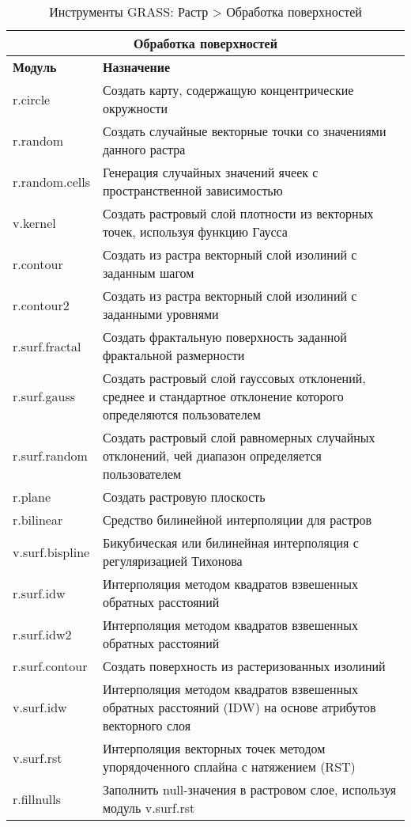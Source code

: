 {\renewcommand{\arraystretch}{0.7}
\begin{table}[H]
\centering
 \begin{tabular}{|p{4cm}|p{10cm}|}
  \hline \multicolumn{2}{|c|}{\textbf{Обработка поверхностей}} \\
  \hline \textbf{Модуль} & \textbf{Назначение} \\
  \hline r.circle & Создать карту, содержащую концентрические окружности \\
  \hline r.random & Создать случайные векторные точки со значениями данного
  растра \\
  \hline r.random.cells & Генерация случайных значений ячеек с
  пространственной зависимостью \\
  \hline v.kernel & Создать растровый слой плотности из векторных
  точек, используя функцию Гаусса \\
  \hline r.contour & Создать из растра векторный слой изолиний с
  заданным шагом \\
  \hline r.contour2 & Создать из растра векторный слой изолиний с
  заданными уровнями \\
  \hline r.surf.fractal & Создать фрактальную поверхность заданной
  фрактальной размерности \\
  \hline r.surf.gauss & Создать растровый слой гауссовых отклонений,
  среднее и стандартное отклонение которого определяются пользователем \\
  \hline r.surf.random & Создать растровый слой равномерных случайных
  отклонений, чей диапазон определяется пользователем \\
  \hline r.plane & Создать растровую плоскость \\
  \hline r.bilinear & Средство билинейной интерполяции для растров \\
  \hline v.surf.bispline & Бикубическая или билинейная интерполяция с
  регуляризацией Тихонова \\
  \hline r.surf.idw & Интерполяция методом квадратов взвешенных обратных
  расстояний \\
  \hline r.surf.idw2 & Интерполяция методом квадратов взвешенных обратных
  расстояний \\
  \hline r.surf.contour & Создать поверхность из растеризованных изолиний \\
  \hline v.surf.idw & Интерполяция методом квадратов взвешенных обратных
  расстояний (IDW) на основе атрибутов векторного слоя \\
  \hline v.surf.rst & Интерполяция векторных точек методом упорядоченного
  сплайна с натяжением (RST) \\
  \hline r.fillnulls & Заполнить null-значения в растровом слое, используя
  модуль v.surf.rst \\
\hline
\end{tabular}
\caption{Инструменты GRASS: Растр > Обработка поверхностей}
\end{table}}

